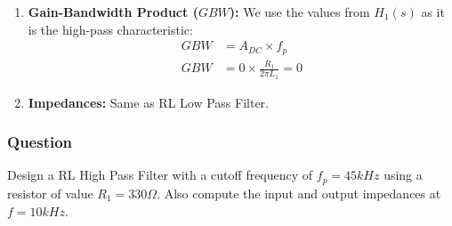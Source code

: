 \begin{enumerate}
\begin{align*}
          H_2(0) &= 1
        \end{align*}
      Unity DC gain for \(H_2(s)\).
    \item \textbf{Gain-Bandwidth Product (\(GBW\)):}
      We use the values from \(H_1(s)\) as it is the
      high-pass characteristic:
      \begin{align*}
        GBW &= A_{DC} \times f_p \\
        GBW &= 0 \times \frac{R_1}{2 \pi L_1} = 0
      \end{align*}
    \item \textbf{Impedances:}
      Same as RL Low Pass Filter.
\end{enumerate}

\subsubsection{Question}
Design a RL High Pass Filter with a cutoff frequency of
\(f_p = 45kHz\) using a resistor of value \(R_1 = 330 \Omega\).
Also compute the input and output impedances at
\(f = 10kHz\).
